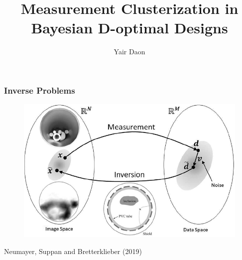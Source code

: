 \documentclass{beamer}
\title{Measurement Clusterization in Bayesian D-optimal Designs}
\author{Yair Daon}
\institute{Azrieli Faculty of Medicine, Bar-Ilan University}
\date{}
\begin{document}

\begin{frame}
  \titlepage
\end{frame}


\begin{frame}
  \frametitle{Inverse Problems}

  \begin{figure}
    \centering
    \includegraphics[width=\textwidth]{inverse_problem.png}
  \end{figure}

  \footnotesize{Neumayer, Suppan and Bretterklieber (2019)}
\end{frame}
\end{document}
